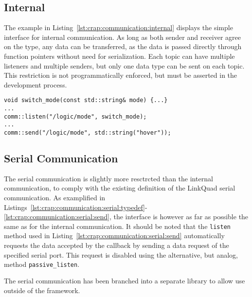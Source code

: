         \subsection{Internal}
        The example in Listing~\ref{lst:crap:communication:internal}
        displays the simple interface for internal communication.
        As long as both sender and receiver agree on the type, any data
        can be transferred, as the data is passed directly through function
        pointers without need for serialization. Each topic can have multiple listeners
        and multiple senders, but only one data type can be sent on each topic.
        This restriction is not programmatically enforced, but must be asserted
        in the development process.

        \begin{minipage}{\textwidth}
        \begin{lstlisting}
void switch_mode(const std::string& mode) {...}
...
comm::listen("/logic/mode", switch_mode);
...
comm::send("/logic/mode", std::string("hover"));
        \end{lstlisting}
        \end{minipage}

        \subsection{Serial Communication}
            The serial communication is slightly more resctrcted than the
            internal communication, to comply with the existing definition
            of the LinkQuad serial communication.
            As examplified in Listings~\ref{lst:crap:communication:serial:typedef}-\ref{lst:crap:communication:serial:send},
            the interface is however as far as possible the same as for the internal
            communication. It should be noted that the \texttt{listen} method
            used in Listing~\ref{lst:crap:communication:serial:send}
            automatically requests the data accepted by the callback by sending
            a data request of the specified serial port. This request is
            disabled using the alternative, but analog, method \texttt{passive\_listen}.

            The serial communication has been branched into a separate
            library to allow use outside of the \crap framework.

